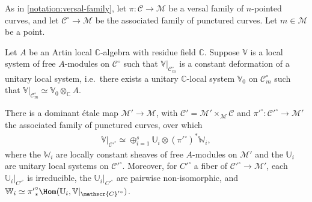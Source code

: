 As in \autoref{notation:versal-family}, let $\pi: \mathscr{C}\to \mathscr{M}$ be a versal family of $n$-pointed curves, and let $\mathscr{C}^\circ\to \mathscr{M}$ be the associated family of punctured curves. Let $m\in\mathscr{M}$ be a point.

\begin{lemma}
\notready
	\label{lemma:unitary-direct-sum}
	Let $A$ be an Artin local $\mathbb{C}$-algebra with residue field $\mathbb{C}$.
	Suppose $\mathbb V$ is a local system of free $A$-modules on $\mathscr C^\circ$
	such that $\mathbb V|_{\mathscr C^\circ_m}$ is a constant deformation of a unitary local system, i.e.~there exists a unitary $\mathbb{C}$-local system $\mathbb{V}_0$ on $\mathscr C^\circ_m$ such that $\mathbb V|_{\mathscr C^\circ_m}\simeq \mathbb{V}_0\otimes_\mathbb{C} A$.

	There is a dominant \'etale map $\mathscr M' \to \mathscr M$, with $\mathscr{C}'=\mathscr{M}'\times_\mathscr{M}\mathscr{C}$ and ${\pi'}^\circ: {\mathscr{C}'}^\circ\to \mathscr{M}'$  the associated family of punctured curves, over
	which
	\begin{align*}
	\mathbb V|_{ {\mathscr{C}'}^\circ} \simeq \oplus_{i=1}^s \mathbb U_i
\otimes ({\pi'}^\circ)^* \mathbb
W_i,
	\end{align*}
where the $\mathbb W_i$ are locally constant sheaves of free $A$-modules on $\mathscr M'$ and
	the $\mathbb U_i$ are unitary local systems on ${\mathscr{C}'}^\circ$.
	Moreover, for $C'^\circ$ a fiber of $\mathscr{C}'^\circ \to
	\mathscr{M}'$, each $\mathbb{U}_i|_{C'^\circ}$ is irreducible, the
	$\mathbb{U}_i|_{C'^\circ}$ are pairwise non-isomorphic,
	and $\mathbb W_i \simeq {\pi'}^\circ_*\Hom(\mathbb U_i, \mathbb V|_{ {\mathscr{C}'}^\circ} )$.
\end{lemma}
